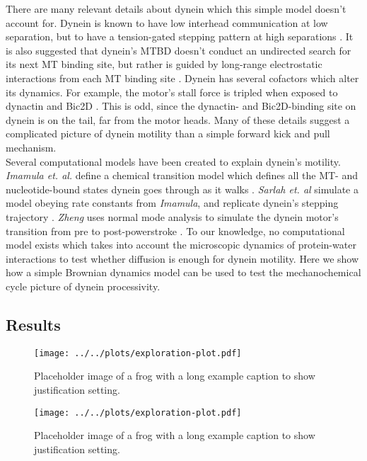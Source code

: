 \documentclass[9pt,twocolumn,twoside,lineno]{pnas-new}
\begin{document}
There are many relevant details about dynein which this simple model doesn't account for. Dynein is known to have low interhead communication at low separation, but to have a tension-gated stepping pattern at high separations \cite{yildizpaper}. It is also suggested that dynein's MTBD doesn't conduct an undirected search for its next MT binding site, but rather is guided by long-range electrostatic interactions from each MT binding site \cite{longrangemt}. Dynein has several cofactors which alter its dynamics. For example, the motor's stall force is tripled when exposed to dynactin and Bic2D \cite{yildizdynactin}. This is odd, since the dynactin- and Bic2D-binding site on dynein is on the tail, far from the motor heads. Many of these details suggest a complicated picture of dynein motility than a simple forward kick and pull mechanism.\\

Several computational models have been created to explain dynein's motility. \textit{Imamula et. al.} define a chemical transition model which defines all the MT- and nucleotide-bound states dynein goes through as it walks \cite{imamulamodel}. \textit{Sarlah et. al} simulate a model obeying rate constants from \textit{Imamula}, and replicate dynein's stepping trajectory \cite{sarlahmodel}. \textit{Zheng} uses normal mode analysis to simulate the dynein motor's transition from pre to post-powerstroke \cite{normalmodes}. To our knowledge, no computational model exists which takes into account the microscopic dynamics of protein-water interactions to test whether diffusion is enough for dynein motility. Here we show how a simple Brownian dynamics model can be used to test the mechanochemical cycle picture of dynein processivity.\\

\subsection{Results}


\begin{figure*}%
\centering
\texttt{[image: ../../plots/exploration-plot.pdf]}
\caption{Placeholder image of a frog with a long example caption to show justification setting.}
\label{fig:trajectory}
\end{figure*}

\begin{figure}%
\centering
\texttt{[image: ../../plots/exploration-plot.pdf]}
\caption{Placeholder image of a frog with a long example caption to show justification setting.}
\label{fig:trajectory}
\end{figure}

\pnasbreak


\end{document}
